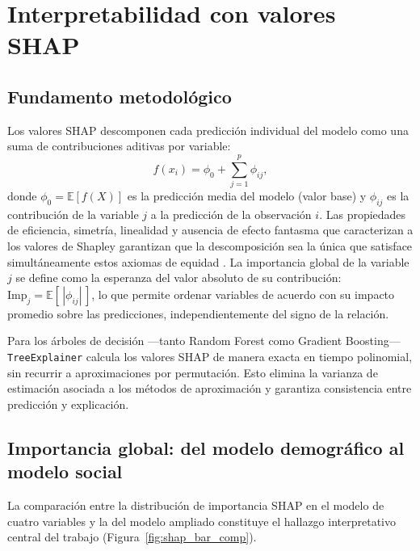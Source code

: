 \documentclass[12pt, a4paper]{article}
\newcommand{\citep}[1]{\cite{#1}}
\begin{document}
\section{Interpretabilidad con valores SHAP}\label{sec:shap}

\subsection{Fundamento metodológico}

Los valores SHAP \citep{informal:lundberg2017} descomponen cada predicción individual del modelo como una suma de contribuciones aditivas por variable:
\[
f(x_i) = \phi_0 + \sum_{j=1}^{p} \phi_{ij},
\]
donde $\phi_0 = \mathbb{E}[f(X)]$ es la predicción media del modelo (valor base) y $\phi_{ij}$ es la contribución de la variable $j$ a la predicción de la observación $i$. Las propiedades de eficiencia, simetría, linealidad y ausencia de efecto fantasma que caracterizan a los valores de Shapley garantizan que la descomposición sea la única que satisface simultáneamente estos axiomas de equidad \citep{informal:lundberg2017}. La importancia global de la variable $j$ se define como la esperanza del valor absoluto de su contribución: $\text{Imp}_j = \mathbb{E}[\,|\phi_{ij}|\,]$, lo que permite ordenar variables de acuerdo con su impacto promedio sobre las predicciones, independientemente del signo de la relación.

Para los árboles de decisión —tanto Random Forest como Gradient Boosting— \texttt{TreeExplainer} calcula los valores SHAP de manera exacta en tiempo polinomial, sin recurrir a aproximaciones por permutación. Esto elimina la varianza de estimación asociada a los métodos de aproximación y garantiza consistencia entre predicción y explicación.

\subsection{Importancia global: del modelo demográfico al modelo social}\label{sec:shap_importancia}

La comparación entre la distribución de importancia SHAP en el modelo de cuatro variables y la del modelo ampliado constituye el hallazgo interpretativo central del trabajo (Figura~\ref{fig:shap_bar_comp}).
\end{document}

